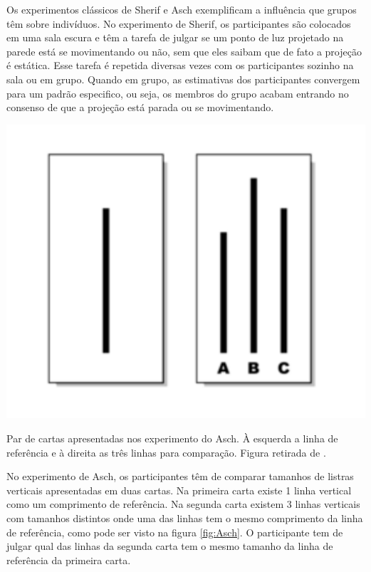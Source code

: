Os experimentos clássicos de Sherif e Asch 
exemplificam a influência que grupos têm sobre
indivíduos\citep{Caticha2011a}. No experimento de Sherif, os participantes
são colocados em uma sala escura e têm a tarefa de julgar se um ponto de
luz projetado na parede está se movimentando ou não, sem que eles saibam
que de fato a projeção é estática.  Esse tarefa é repetida diversas
vezes com os participantes sozinho na sala ou em grupo. Quando em grupo,
as estimativas dos participantes convergem para um padrão especifico, ou
seja, os membros do grupo acabam entrando no consenso de que a projeção
está parada ou se movimentando.

\begin{marginfigure}
\linespread{1}
\centering
\includegraphics[width=\textwidth]{Figures/Asch}
\caption{
Par de cartas apresentadas nos experimento do Asch. À esquerda a linha de
referência e à direita as três linhas para comparação. Figura retirada de
\citep{AschWiki}.}
\label{fig:Asch}
\end{marginfigure}

No experimento de Asch, os participantes têm de comparar tamanhos de listras
verticais apresentadas em duas cartas. Na primeira carta existe 1 linha vertical
como um comprimento de referência. Na segunda carta existem 3 linhas verticais
com tamanhos distintos onde uma das linhas tem o mesmo comprimento da
linha de referência, como pode ser visto na figura \ref{fig:Asch}. 
O participante tem de julgar qual das linhas da segunda carta tem o mesmo
tamanho da linha de referência da primeira carta. 

